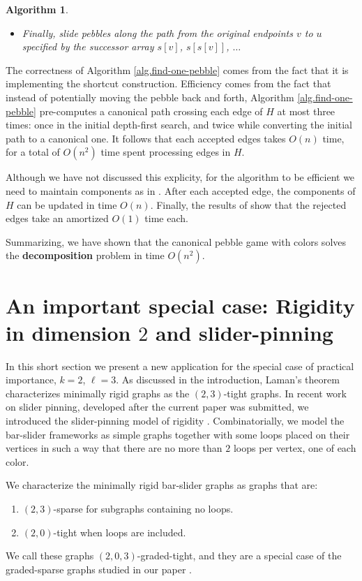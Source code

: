 \documentclass[Svgc,nospthms]{Svgc}
\newtheorem{algorithm}[theorem]{Algorithm}
\newcommand{\refalg}[1]{Algorithm \ref{alg.#1}}
\begin{document}
\begin{algorithm}
\begin{itemize}
	\item	Finally, slide pebbles along the path from 
	the original endpoints $v$ to $u$ specified by the successor array $s[v]$, $s[s[v]]$, $\ldots$
	\end{itemize}
	\end{algorithm}

	The correctness of \refalg{find-one-pebble} comes from the fact that it is
	implementing the shortcut construction.
	Efficiency comes from the fact that instead of potentially moving the 
	pebble back and forth, \refalg{find-one-pebble} pre-computes a canonical
	path crossing each edge of $H$ at most three times: once in the initial
	depth-first search, and twice while converting the initial path to a 
	canonical one.  It follows that each accepted edges takes $O(n)$ time, for
	a total of $O(n^2)$ time spent processing edges in $H$.

	Although we have not discussed this explicity, for the algorithm to be efficient
	we need to maintain components as in \cite{pebblegame}.
	After each accepted edge, the components of $H$ 
	can be updated in time $O(n)$. Finally,  the results of 
	\cite{pebblegame,cccg} show that the rejected edges take an amortized $O(1)$ time each.

	Summarizing, we have shown that the canonical pebble game with colors 
	solves the {\bf decomposition} problem in time $O(n^2)$.
	
	\section{An important special case: Rigidity in dimension $2$ and slider-pinning}
	In this short section we present a new application for the special case of 
	practical importance, $k=2$, $\ell=3$.  As discussed in the introduction,
	Laman's theorem \cite{laman} characterizes minimally rigid graphs as the $(2,3)$-tight
	graphs.  In  recent work on slider pinning,  developed after the current 
	paper was submitted, we introduced the slider-pinning model of rigidity \cite{sliders,genericity}.
	Combinatorially, we model the bar-slider frameworks as simple graphs together with some 
	loops placed on their vertices in such a way that there are no more than $2$ loops per 
	vertex, one of each color.  
	
	We characterize the minimally rigid bar-slider graphs \cite{genericity}
	as graphs that are: 
	\begin{enumerate}
		\item $(2,3)$-sparse for subgraphs containing no loops.
		\item $(2,0)$-tight when loops are included.
	\end{enumerate}
	We call these graphs $(2,0,3)$-graded-tight, and they are a special case of 
	the graded-sparse graphs studied in our paper \cite{graded}.
\end{document}
